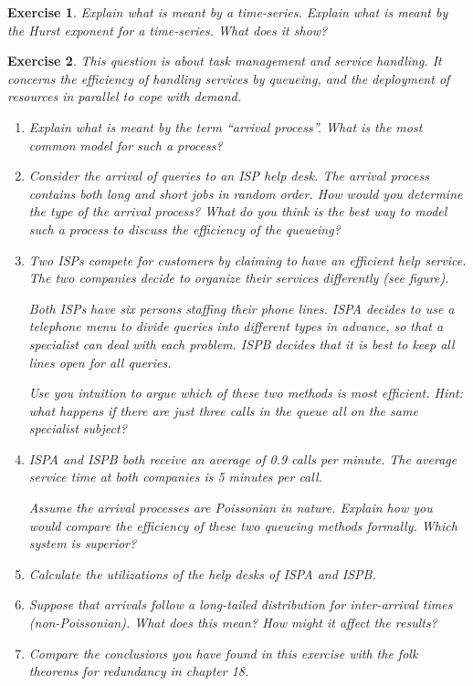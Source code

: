 \documentclass{book}
\newtheorem{exercise}{Exercise}
\begin{document}
\begin{exercise} 
Explain what is meant by a time-series.
Explain what is meant by the Hurst exponent for a time-series. What does it show?
\end{exercise}
\begin{solution}
\end{solution}


\begin{exercise} 
This question is about task management and service handling.
It concerns the efficiency of handling services by queueing, and the
deployment of resources in parallel to cope with demand.
\begin{enumerate}
\item Explain what is meant by the term ``arrival process''. What is the most
common model for such a process?

\item Consider the arrival of queries to an ISP help desk. The arrival process
contains both long and short jobs in random order. How would you
determine the type of the arrival process? What do you think is the
best way to model such a process to discuss the efficiency of the
queueing?

\item Two ISPs compete for customers by claiming to have an efficient help service.
The two companies decide to organize their services differently (see
figure).
\begin{figure}[ht]
\end{figure}
Both ISPs have six persons staffing their phone lines. ISPA decides to
use a telephone menu to divide queries into different types in
advance, so that a specialist can deal with each problem. ISPB decides
that it is best to keep all lines open for all queries.

Use you intuition to argue which of these two methods is most
efficient. Hint: what happens if there are just three calls in the
queue all on the same specialist subject?

\item ISPA and ISPB both receive an average of
0.9 calls per minute. The average service time at both companies is 5
minutes per call.

Assume the arrival processes are Poissonian in nature.  Explain how
you would compare the efficiency of these two queueing methods
formally.  Which system is superior?

\item Calculate the utilizations of the help desks of ISPA and ISPB.

\item Suppose that arrivals follow a long-tailed distribution for
inter-arrival times (non-Poissonian).
What does this mean? How might it affect the results?

\item Compare the conclusions you have found in this exercise with the 
folk theorems for redundancy in chapter 18.
\end{enumerate}
\end{exercise}
\begin{solution}
\end{solution}
\end{document}

